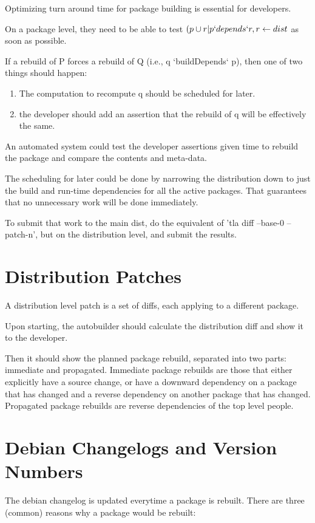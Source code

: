 \documentclass[12pt]{article}
\begin{document}
Optimizing turn around time for package building is essential for
developers.

On a package level, they need to be able to test $({p} \cup
{r | p `depends` r, r \leftarrow dist}$
as soon as possible.

If a rebuild of P forces a rebuild of Q (i.e., q `buildDepends` p),
then one of two things should happen:
\begin{enumerate}
\item The computation to recompute q should be scheduled for later.
\item the developer should add an assertion that the rebuild of q will
  be effectively the same.
\end{enumerate}
An automated system could test the developer assertions given time to
rebuild the package and compare the contents and meta-data.

The scheduling for later could be done by narrowing the distribution
down to just the build and run-time dependencies for all the active
packages.  That guarantees that no unnecessary work will be done
immediately.

To submit that work to the main dist, do the equivalent of 'tla diff
--base-0 --patch-n', but on the distribution level, and submit the
results.

\section{Distribution Patches}

A distribution level patch is a set of diffs, each applying to a
different package.

Upon starting, the autobuilder should calculate the distribution diff
and show it to the developer.

Then it should show the planned package rebuild, separated into two
parts: immediate and propagated.  Immediate package rebuilds are those
that either explicitly have a source change, or have a downward
dependency on a package that has changed and a reverse dependency on
another package that has changed.  Propagated package rebuilds are
reverse dependencies of the top level people.

\section{Debian Changelogs and Version Numbers}

The debian changelog is updated everytime a package is rebuilt. There
are three (common) reasons why a package would be rebuilt:
\end{document}
